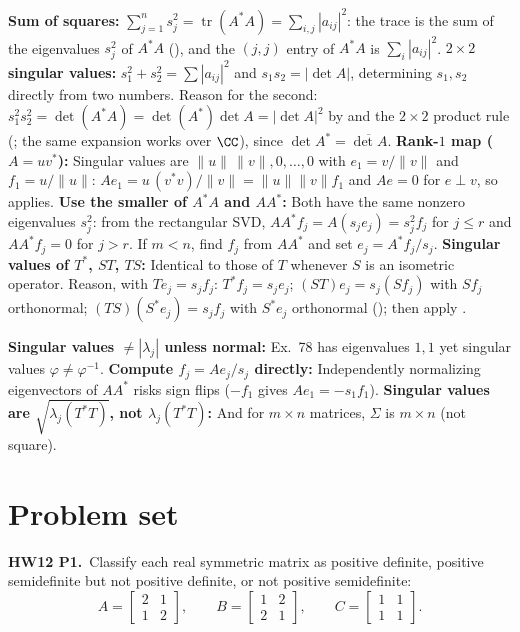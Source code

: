 \documentclass[10pt]{scrartcl}
\DeclareMathOperator{\tr}{tr}\DeclareMathOperator{\nul}{null}\DeclareMathOperator{\range}{range}\DeclareMathOperator{\spn}{span}
\begin{document}
\begin{shortcuts}
  \ii \textbf{Sum of squares:} $\sum_{j=1}^n s_j^2 = \tr(A^*A) = \sum_{i,j}|a_{ij}|^2$: the trace is the sum of the eigenvalues $s_j^2$ of $A^*A$ (), and the $(j,j)$ entry of $A^*A$ is $\sum_i|a_{ij}|^2$.
  \ii \textbf{$2\times2$ singular values:} $s_1^2+s_2^2=\sum|a_{ij}|^2$ and $s_1s_2=|\det A|$, determining $s_1,s_2$ directly from two numbers. Reason for the second: $s_1^2s_2^2=\det(A^*A)=\det(A^*)\det A=|\det A|^2$ by  and the $2\times2$ product rule (; the same expansion works over $\CC$), since $\det A^*=\overline{\det A}$.
  \ii \textbf{Rank-$1$ map ($A=uv^*$):} Singular values are $\|u\|\,\|v\|,0,\dots,0$ with $e_1=v/\|v\|$ and $f_1=u/\|u\|$: $Ae_1=u\,(v^*v)/\|v\|=\|u\|\|v\|f_1$ and $Ae=0$ for $e\perp v$, so  applies.
  \ii \textbf{Use the smaller of $A^*A$ and $AA^*$:} Both have the same nonzero eigenvalues $s_j^2$: from the rectangular SVD, $AA^*f_j=A(s_je_j)=s_j^2f_j$ for $j\le r$ and $AA^*f_j=0$ for $j>r$. If $m<n$, find $f_j$ from $AA^*$ and set $e_j=A^*f_j/s_j$.
  \ii \textbf{Singular values of $T^*$, $ST$, $TS$:} Identical to those of $T$ whenever $S$ is an isometric operator. Reason, with $Te_j=s_jf_j$: $T^*f_j=s_je_j$; $(ST)e_j=s_j(Sf_j)$ with $Sf_j$ orthonormal; $(TS)(S^*e_j)=s_jf_j$ with $S^*e_j$ orthonormal (); then apply .
\end{shortcuts}

\begin{trapbox}
  \ii \textbf{Singular values $\neq |\lambda_j|$ unless normal:} Ex.~78 has eigenvalues $1,1$ yet singular values $\varphi\neq\varphi^{-1}$.
  \ii \textbf{Compute $f_j=Ae_j/s_j$ directly:} Independently normalizing eigenvectors of $AA^*$ risks sign flips ($-f_1$ gives $Ae_1=-s_1f_1$).
  \ii \textbf{Singular values are $\sqrt{\lambda_j(T^*T)}$, not $\lambda_j(T^*T)$:} And for $m\times n$ matrices, $\Sigma$ is $m\times n$ (not square).
\end{trapbox}

\section{Problem set}

\begin{prob}
  \textbf{HW12 P1.}\ Classify each real symmetric matrix as positive definite, positive semidefinite but not positive definite, or not positive semidefinite:
  \[
    A=\begin{bmatrix}2&1\\1&2\end{bmatrix},\qquad
    B=\begin{bmatrix}1&2\\2&1\end{bmatrix},\qquad
    C=\begin{bmatrix}1&1\\1&1\end{bmatrix}.
  \]

\end{prob}
\end{document}
